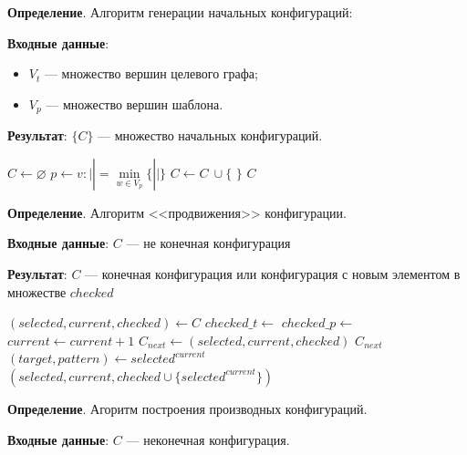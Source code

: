 \textbf{Определение}. Алгоритм генерации начальных конфигураций:

\textbf{Входные данные}:
\begin{itemize}
\item $V_t$ --- множество вершин целевого графа;
\item $V_p$ --- множество вершин шаблона.
\end{itemize}

\textbf{Результат}: $\{ C \}$ --- множество начальных конфигураций.

\begin{algorithmic}
    \State $C \gets \varnothing$
    \State $p \gets v : |$$| = \min\limits_{w \in V_p} \{ |$$| \}$
            \State $C \gets C \ \cup \{$  $\}$
        \EndFor
    \EndFor
    \State \Return $C$
\EndFunction
\end{algorithmic}

\textbf{Определение}. Алгоритм <<продвижения>> конфигурации.

\textbf{Входные данные}: $C$ --- не конечная конфигурация

\textbf{Результат}: $C$ --- конечная конфигурация или конфигурация с новым
элементом в множестве $checked$

\begin{algorithmic}
    \State $(selected, current, checked) \gets C$
    \State $checked\_t \gets$ 
    \State $checked\_p \gets$ 
        \State $current \gets current + 1$
        \State $C_{next} \gets (selected, current, checked)$
            \State \Return $C_{next}$
        \EndIf
        \State $(target, pattern) \gets selected^{current}$
            \State \Return $(selected, current, checked \cup \{ selected^{current} \})$
        \EndIf
    \EndWhile
\EndFunction
\end{algorithmic}

\textbf{Определение}. Агоритм построения производных конфигураций.

\textbf{Входные данные}: $C$ --- неконечная конфигурация.

